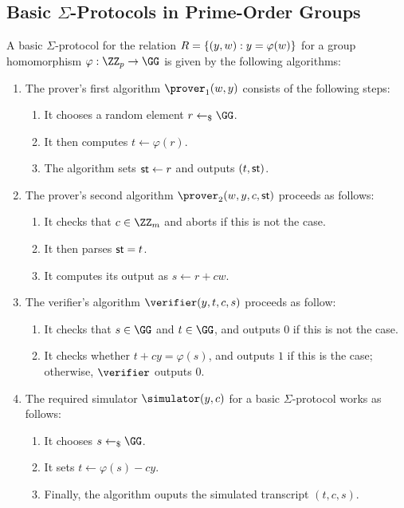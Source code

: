 \documentclass[runningheads]{llncs}
\begin{document}
\subsection{Basic $\Sigma$-Protocols in Prime-Order Groups}
A basic $\Sigma$-protocol for the relation $R=\{(y,w) : y=\varphi(w)\}$ for a group homomorphism $\varphi:\ZZ_p\to\GG$ is given by the following algorithms:

\begin{enumerate}
  \item
    The prover's first algorithm $\prover_1(w,y)$ consists of the following steps:
    \begin{enumerate}
      \item
        It chooses a random element $r\getsr\GG$.
      \item
        It then computes $t\gets\varphi(r)$.
      \item
	The algorithm sets $\mathsf{st}\gets r$ and outputs $(t,\mathsf{st})$.
    \end{enumerate}
  \item
    The prover's second algorithm $\prover_2(w,y,c,\st)$ proceeds as follows:
    \begin{enumerate}
      \item
        It checks that $c\in\ZZ_m$ and aborts if this is not the case.
      \item
	It then parses $\mathsf{st}=t$.
      \item
        It computes its output as $s\gets r+cw$.
    \end{enumerate}
  \item
    The verifier's algorithm $\verifier(y,t,c,s)$ proceeds as follow:
    \begin{enumerate}
      \item
        It checks that $s\in\GG$ and $t\in\GG$, and outputs $0$ if this is not the case.
      \item
	It checks whether $t + cy = \varphi(s)$, and outputs $1$ if this is the case; otherwise, $\verifier$ outputs $0$.
    \end{enumerate}
  \item
    The required simulator $\simulator(y,c)$ for a basic $\Sigma$-protocol works as follows:
    \begin{enumerate}
      \item
        It chooses $s\getsr\GG$.
      \item
        It sets $t \gets \varphi(s) - cy$.
      \item
        Finally, the algorithm ouputs the simulated transcript $(t,c,s)$.
    \end{enumerate}
\end{enumerate}
\end{document}
